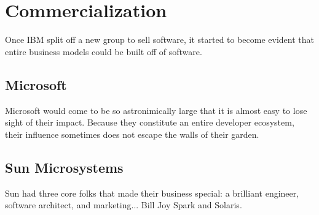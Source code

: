 
\section{Commercialization}

Once IBM split off a new group to sell software, it started to become
evident that entire business models could be built off of software.

\subsection{Microsoft}

Microsoft would come to be so astronimically large that it is almost easy
to lose sight of their impact. Because they constitute an entire
developer ecosystem, their influence sometimes does not escape the walls
of their garden.


\subsection{Sun Microsystems}

Sun had three core folks that made their business special: a brilliant engineer, software architect, and marketing...
Bill Joy Spark and Solaris.
